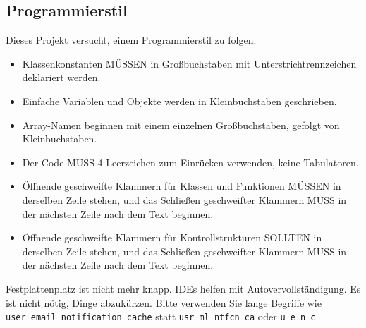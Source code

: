 \subsection{Programmierstil}
Dieses Projekt versucht, einem Programmierstil zu folgen.
\begin{itemize}
\item Klassenkonstanten MÜSSEN in Großbuchstaben mit Unterstrichtrennzeichen
deklariert werden.
\item Einfache Variablen und Objekte werden in Kleinbuchstaben geschrieben.
\item Array-Namen beginnen mit einem einzelnen Großbuchstaben, gefolgt von
Kleinbuchstaben.
\item Der Code MUSS 4 Leerzeichen zum Einrücken verwenden, keine Tabulatoren.
\item Öffnende geschweifte Klammern für Klassen und Funktionen MÜSSEN in derselben
Zeile stehen, und das Schließen geschweifter Klammern MUSS in der nächsten
Zeile nach dem Text beginnen.
\item Öffnende geschweifte Klammern für Kontrollstrukturen SOLLTEN in derselben
Zeile stehen, und das Schließen geschweifter Klammern MUSS in der nächsten
Zeile nach dem Text beginnen.
\end{itemize}
Festplattenplatz ist nicht mehr knapp. IDEs helfen mit Autovervollständigung. Es ist nicht nötig, Dinge abzukürzen.
Bitte verwenden Sie lange Begriffe wie \lstinline|user_email_notification_cache| statt
\lstinline|usr_ml_ntfcn_ca| oder \lstinline|u_e_n_c|.

